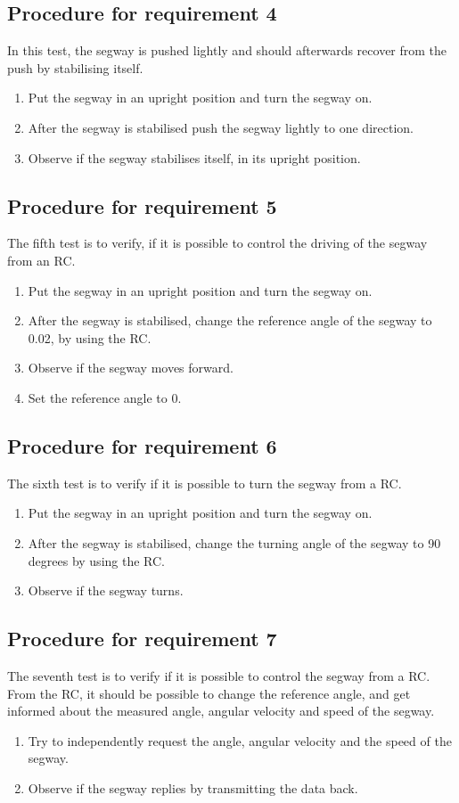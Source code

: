 \subsection{Procedure for requirement 4}
In this test, the segway is pushed lightly and should afterwards recover from the push by stabilising itself. 
\begin{enumerate}
\item Put the segway in an upright position and turn the segway on.
\item After the segway is stabilised push the segway lightly to one direction.
\item Observe if the segway stabilises itself, in its upright position.
\end{enumerate}

\subsection{Procedure for requirement 5}
The fifth test is to verify, if it is possible to control the driving of the segway from an RC.
\begin{enumerate}
\item Put the segway in an upright position and turn the segway on.
\item After the segway is stabilised, change the reference angle of the segway to 0.02, by using the RC.
\item Observe if the segway moves forward.
\item Set the reference angle to 0.
\end{enumerate}

\subsection{Procedure for requirement 6}
The sixth test is to verify if it is possible to turn the segway from a RC.
\begin{enumerate}
\item Put the segway in an upright position and turn the segway on.
\item After the segway is stabilised, change the turning angle of the segway to 90 degrees by using the RC.
\item Observe if the segway turns.
\end{enumerate}

\subsection{Procedure for requirement 7}
The seventh test is to verify if it is possible to control the segway from a RC. From the RC, it should be possible to change the reference angle, and get informed about the measured angle, angular velocity and speed of the segway.
\begin{enumerate}
\item Try to independently request the angle, angular velocity and the speed of the segway.
\item Observe if the segway replies by transmitting the data back.
\end{enumerate}
\newpage
